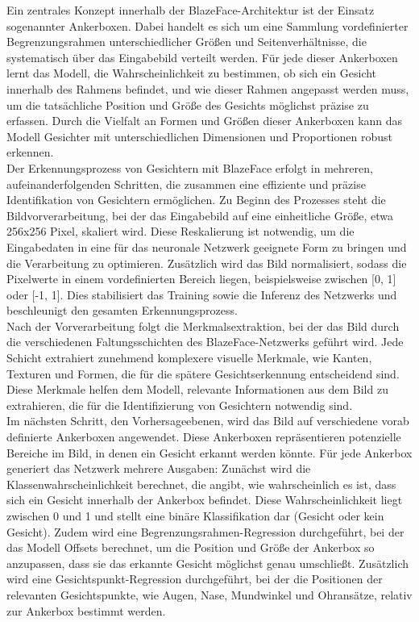 Ein zentrales Konzept innerhalb der BlazeFace-Architektur ist der Einsatz sogenannter Ankerboxen. Dabei handelt es sich um eine Sammlung vordefinierter Begrenzungsrahmen unterschiedlicher Größen und Seitenverhältnisse, die systematisch über das Eingabebild verteilt werden. Für jede dieser Ankerboxen lernt das Modell, die Wahrscheinlichkeit zu bestimmen, ob sich ein Gesicht innerhalb des Rahmens befindet, und wie dieser Rahmen angepasst werden muss, um die tatsächliche Position und Größe des Gesichts möglichst präzise zu erfassen. Durch die Vielfalt an Formen und Größen dieser Ankerboxen kann das Modell Gesichter mit unterschiedlichen Dimensionen und Proportionen robust erkennen. \\
Der Erkennungsprozess von Gesichtern mit BlazeFace erfolgt in mehreren, aufeinanderfolgenden Schritten, die zusammen eine effiziente und präzise Identifikation von Gesichtern ermöglichen. Zu Beginn des Prozesses steht die Bildvorverarbeitung, bei der das Eingabebild auf eine einheitliche Größe, etwa 256x256 Pixel, skaliert wird. Diese Reskalierung ist notwendig, um die Eingabedaten in eine für das neuronale Netzwerk geeignete Form zu bringen und die Verarbeitung zu optimieren. Zusätzlich wird das Bild normalisiert, sodass die Pixelwerte in einem vordefinierten Bereich liegen, beispielsweise zwischen [0, 1] oder [-1, 1]. Dies stabilisiert das Training sowie die Inferenz des Netzwerks und beschleunigt den gesamten Erkennungsprozess. \\
Nach der Vorverarbeitung folgt die Merkmalsextraktion, bei der das Bild durch die verschiedenen Faltungsschichten des BlazeFace-Netzwerks geführt wird. Jede Schicht extrahiert zunehmend komplexere visuelle Merkmale, wie Kanten, Texturen und Formen, die für die spätere Gesichtserkennung entscheidend sind. Diese Merkmale helfen dem Modell, relevante Informationen aus dem Bild zu extrahieren, die für die Identifizierung von Gesichtern notwendig sind. \\ 
Im nächsten Schritt, den Vorhersageebenen, wird das Bild auf verschiedene vorab definierte Ankerboxen angewendet. Diese Ankerboxen repräsentieren potenzielle Bereiche im Bild, in denen ein Gesicht erkannt werden könnte. Für jede Ankerbox generiert das Netzwerk mehrere Ausgaben: Zunächst wird die Klassenwahrscheinlichkeit berechnet, die angibt, wie wahrscheinlich es ist, dass sich ein Gesicht innerhalb der Ankerbox befindet. Diese Wahrscheinlichkeit liegt zwischen 0 und 1 und stellt eine binäre Klassifikation dar (Gesicht oder kein Gesicht). Zudem wird eine Begrenzungsrahmen-Regression durchgeführt, bei der das Modell Offsets berechnet, um die Position und Größe der Ankerbox so anzupassen, dass sie das erkannte Gesicht möglichst genau umschließt. Zusätzlich wird eine Gesichtspunkt-Regression durchgeführt, bei der die Positionen der relevanten Gesichtspunkte, wie Augen, Nase, Mundwinkel und Ohransätze, relativ zur Ankerbox bestimmt werden. \\
